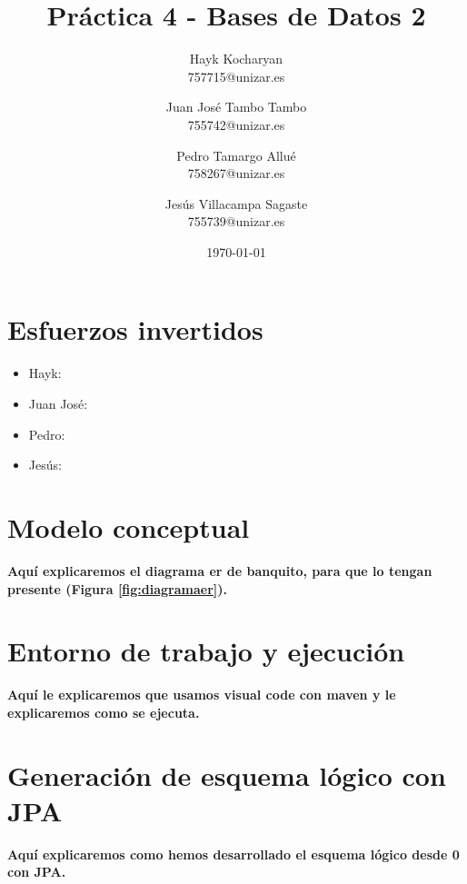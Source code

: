 \documentclass[11pt,a4paper]{article}
\begin{document}
\begin{titlepage}
	\title{{\Huge \textbf{Práctica 4 - Bases de Datos 2}}}
	\author{
	  Hayk Kocharyan\\
	  757715@unizar.es
	  \and
	  Juan José Tambo Tambo\\
	  755742@unizar.es
	  \and
	  Pedro Tamargo Allué\\
	  758267@unizar.es
	  \and
	  Jesús Villacampa Sagaste\\
	  755739@unizar.es
	}
	\date{\today}
	
	\clearpage\maketitle
	\thispagestyle{empty}
	\tableofcontents
	\listoffigures
\end{titlepage}

\section{Esfuerzos invertidos}

\begin{itemize}
\item Hayk:
\item Juan José:
\item Pedro:
\item Jesús:
\end{itemize}

\section{Modelo conceptual}

\textbf{Aquí explicaremos el diagrama er de banquito, para que lo tengan presente (Figura \ref{fig:diagramaer}).}

\section{Entorno de trabajo y ejecución}

\textbf{Aquí le explicaremos que usamos visual code con maven y le explicaremos como se ejecuta.}

\section{Generación de esquema lógico con JPA}

\textbf{Aquí explicaremos como hemos desarrollado el esquema lógico desde 0 con JPA.}
\end{document}
